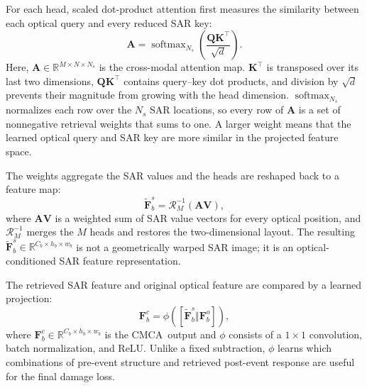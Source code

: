 \documentclass[journal]{IEEEtran}
\newcommand{\cmca}{CMCA}
\begin{document}
    For each head, scaled dot-product attention first measures the similarity between each optical query and every reduced SAR key:
    \begin{equation}
        \mathbf{A}
        =\operatorname{softmax}_{N_s}
        \left(\frac{\mathbf{Q}\mathbf{K}^{\top}}{\sqrt{d}}\right).
        \label{eq:cmca_attention}
    \end{equation}
    Here, $\mathbf{A}\in\mathbb{R}^{M\times N\times N_s}$ is the cross-modal attention map. $\mathbf{K}^{\top}$ is transposed over its last two dimensions, $\mathbf{Q}\mathbf{K}^{\top}$ contains query--key dot products, and division by $\sqrt{d}$ prevents their magnitude from growing with the head dimension. $\operatorname{softmax}_{N_s}$ normalizes each row over the $N_s$ SAR locations, so every row of $\mathbf{A}$ is a set of nonnegative retrieval weights that sums to one. A larger weight means that the learned optical query and SAR key are more similar in the projected feature space.
    
    The weights aggregate the SAR values and the heads are reshaped back to a feature map:
    \begin{equation}
        \tilde{\mathbf{F}}^{s}_{b}
        =\mathcal{R}^{-1}_{M}(\mathbf{A}\mathbf{V}),
        \label{eq:cmca_retrieval}
    \end{equation}
    where $\mathbf{A}\mathbf{V}$ is a weighted sum of SAR value vectors for every optical position, and $\mathcal{R}^{-1}_{M}$ merges the $M$ heads and restores the two-dimensional layout. The resulting $\tilde{\mathbf{F}}^{s}_{b}\in\mathbb{R}^{C_b\times h_b\times w_b}$ is not a geometrically warped SAR image; it is an optical-conditioned SAR feature representation.
    
    The retrieved SAR feature and original optical feature are compared by a learned projection:
    \begin{equation}
        \mathbf{F}^{c}_{b}
        =\phi\!\left(
        [\tilde{\mathbf{F}}^{s}_{b}\Vert\mathbf{F}^{o}_{b}]
        \right),
        \label{eq:change_projection}
    \end{equation}
    where $\mathbf{F}^{c}_{b}\in\mathbb{R}^{C_b\times h_b\times w_b}$ is the \cmca\ output and $\phi$ consists of a $1\times1$ convolution, batch normalization, and ReLU. Unlike a fixed subtraction, $\phi$ learns which combinations of pre-event structure and retrieved post-event response are useful for the final damage loss.
    
\end{document}
